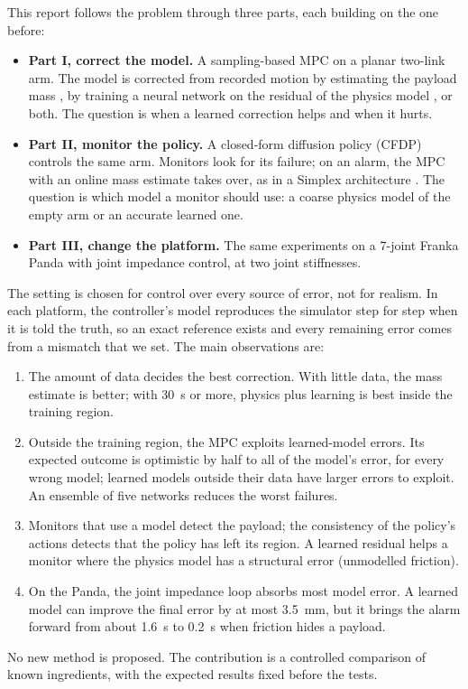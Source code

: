 \documentclass[conference]{IEEEtran}
\begin{document}
This report follows the problem through three parts, each building on the one before:
\begin{itemize}
\item \textbf{Part I, correct the model.} A sampling-based MPC on a planar two-link arm. The model is corrected from recorded motion by estimating the payload mass \cite{atkeson1986estimation}, by training a neural network on the residual of the physics model \cite{shi2019neural,carron2019data}, or both. The question is when a learned correction helps and when it hurts.
\item \textbf{Part II, monitor the policy.} A closed-form diffusion policy (CFDP) \cite{mishra2026cfdp} controls the same arm. Monitors look for its failure; on an alarm, the MPC with an online mass estimate takes over, as in a Simplex architecture \cite{sha2001simplex}. The question is which model a monitor should use: a coarse physics model of the empty arm or an accurate learned one.
\item \textbf{Part III, change the platform.} The same experiments on a 7-joint Franka Panda with joint impedance control, at two joint stiffnesses.
\end{itemize}

The setting is chosen for control over every source of error, not for realism.
In each platform, the controller's model reproduces the simulator step for step when it is told the truth, so an exact reference exists and every remaining error comes from a mismatch that we set.
The main observations are:
\begin{enumerate}
\item The amount of data decides the best correction. With little data, the mass estimate is better; with \SI{30}{s} or more, physics plus learning is best inside the training region.
\item Outside the training region, the MPC exploits learned-model errors. Its expected outcome is optimistic by half to all of the model's error, for every wrong model; learned models outside their data have larger errors to exploit. An ensemble of five networks reduces the worst failures.
\item Monitors that use a model detect the payload; the consistency of the policy's actions detects that the policy has left its region. A learned residual helps a monitor where the physics model has a structural error (unmodelled friction).
\item On the Panda, the joint impedance loop absorbs most model error. A learned model can improve the final error by at most \SI{3.5}{mm}, but it brings the alarm forward from about \SI{1.6}{s} to \SI{0.2}{s} when friction hides a payload.
\end{enumerate}
No new method is proposed. The contribution is a controlled comparison of known ingredients, with the expected results fixed before the tests.
\end{document}

